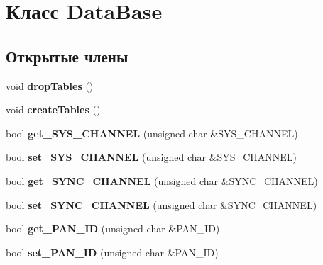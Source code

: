 \hypertarget{classDataBase}{}\section{Класс Data\+Base}
\label{classDataBase}
\subsection*{Открытые члены}
\begin{DoxyCompactItemize}
\item 
\mbox{\label{classDataBase_a064914b90a48c247acd66ae78a5878e7}} 
void {\bfseries drop\+Tables} ()
\item 
\mbox{\label{classDataBase_a0af39b0305bf31a4fb867319aebadb7d}} 
void {\bfseries create\+Tables} ()
\item 
\mbox{\label{classDataBase_a28538c373ed0d86b9b3f7a1d2b4d7a93}} 
bool {\bfseries get\+\_\+\+S\+Y\+S\+\_\+\+C\+H\+A\+N\+N\+EL} (unsigned char \&S\+Y\+S\+\_\+\+C\+H\+A\+N\+N\+EL)
\item 
\mbox{\label{classDataBase_a55177f9cf880859b61b8bf31c2df262e}} 
bool {\bfseries set\+\_\+\+S\+Y\+S\+\_\+\+C\+H\+A\+N\+N\+EL} (unsigned char \&S\+Y\+S\+\_\+\+C\+H\+A\+N\+N\+EL)
\item 
\mbox{\label{classDataBase_aeee20adccabe2213913beb3fb419521c}} 
bool {\bfseries get\+\_\+\+S\+Y\+N\+C\+\_\+\+C\+H\+A\+N\+N\+EL} (unsigned char \&S\+Y\+N\+C\+\_\+\+C\+H\+A\+N\+N\+EL)
\item 
\mbox{\label{classDataBase_aa3af2c808d8f4ff42135ae57dfb66845}} 
bool {\bfseries set\+\_\+\+S\+Y\+N\+C\+\_\+\+C\+H\+A\+N\+N\+EL} (unsigned char \&S\+Y\+N\+C\+\_\+\+C\+H\+A\+N\+N\+EL)
\item 
\mbox{\label{classDataBase_a99942c5843867facb817d5b2f3d7f6bc}} 
bool {\bfseries get\+\_\+\+P\+A\+N\+\_\+\+ID} (unsigned char \&P\+A\+N\+\_\+\+ID)
\item 
\mbox{\label{classDataBase_a1a6de324902a6647da9b0b4dbeea3c1e}} 
bool {\bfseries set\+\_\+\+P\+A\+N\+\_\+\+ID} (unsigned char \&P\+A\+N\+\_\+\+ID)
\item 

\end{DoxyCompactItemize}
